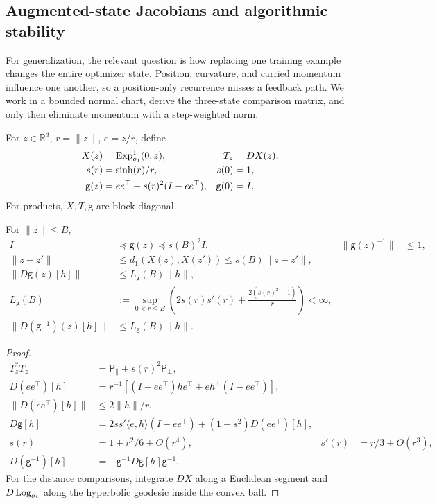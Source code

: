 \subsection{Augmented-state Jacobians and algorithmic stability}
\label{app:rigid-stability}
For generalization, the relevant question is how replacing one training example changes the entire optimizer state. Position, curvature, and carried momentum influence one another, so a position-only recurrence misses a feedback path. We work in a bounded normal chart, derive the three-state comparison matrix, and only then eliminate momentum with a step-weighted norm.
\begin{definition}
For $z\in\mathbb R^d$, $r=\|z\|$, $e=z/r$, define
\begin{align}
 X(z)&=\operatorname{Exp}_{o_1}^1(0,z),&T_z&=DX(z),\\
 s(r)&=\sinh(r)/r,&s(0)&=1,\\
 \mathsf g(z)&=ee^\top+s(r)^2(I-ee^\top),&\mathsf g(0)&=I.
\end{align}
For products, $X,T,\mathsf g$ are block diagonal.
\end{definition}
\begin{lemma}
For $\|z\|\le B$,
\begin{align}
 I&\preceq\mathsf g(z)\preceq s(B)^2I,&
 \|\mathsf g(z)^{-1}\|&\le1,\\
 \|z-z'\|&\le d_1(X(z),X(z'))\le s(B)\|z-z'\|,\\
 \|D\mathsf g(z)[h]\|&\le L_{\mathsf g}(B)\|h\|,\\
 L_{\mathsf g}(B)&:=\sup_{0<r\le B}
 \left(2s(r)s'(r)+\frac{2(s(r)^2-1)}r\right)<\infty,\\
 \|D(\mathsf g^{-1})(z)[h]\|&\le L_{\mathsf g}(B)\|h\|.
\end{align}
\end{lemma}
\begin{proof}
\begin{align}
 T_z^*T_z&=\mathsf P_\parallel+s(r)^2\mathsf P_\perp,\\
 D(ee^\top)[h]&=r^{-1}[(I-ee^\top)he^\top+eh^\top(I-ee^\top)],\\
 \|D(ee^\top)[h]\|&\le2\|h\|/r,\\
 D\mathsf g[h]&=2ss'\langle e,h\rangle(I-ee^\top)+(1-s^2)D(ee^\top)[h],\\
 s(r)&=1+r^2/6+O(r^4),&s'(r)&=r/3+O(r^3),\\
 D(\mathsf g^{-1})[h]&=-\mathsf g^{-1}D\mathsf g[h]\mathsf g^{-1}.
\end{align}
For the distance comparisons, integrate $DX$ along a Euclidean segment and $D\operatorname{Log}_{o_1}$ along the hyperbolic geodesic inside the convex ball.
\end{proof}

